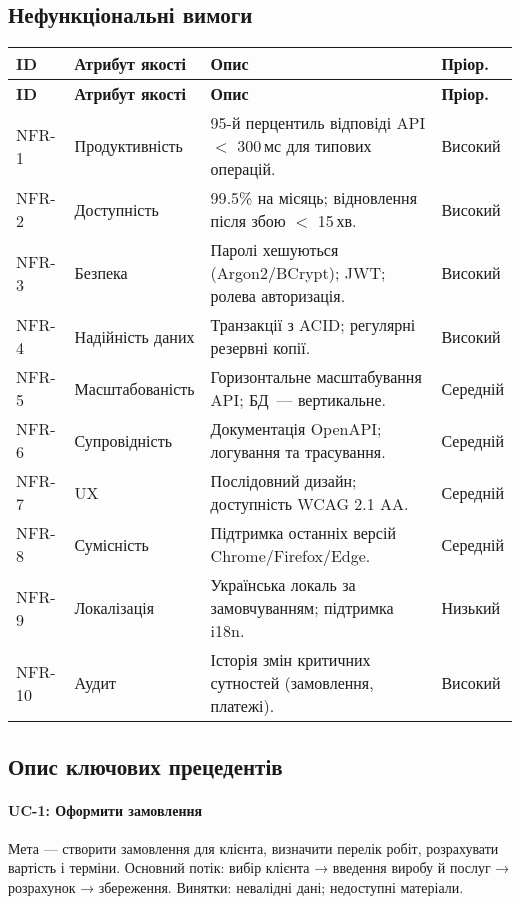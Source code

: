 \documentclass[14pt,a4paper]{extarticle}
\begin{document}
\subsection{Нефункціональні вимоги}
\begin{longtable}{@{}p{1.8cm} p{5.0cm} p{10.0cm} p{2.0cm}@{}}
\toprule
\textbf{ID} & \textbf{Атрибут якості} & \textbf{Опис} & \textbf{Пріор.}\\
\midrule
\endfirsthead
\toprule
\textbf{ID} & \textbf{Атрибут якості} & \textbf{Опис} & \textbf{Пріор.}\\
\midrule
\endhead
NFR-1 & Продуктивність & 95-й перцентиль відповіді API $<$ 300\,мс для типових операцій. & Високий \\
NFR-2 & Доступність & 99{.}5\% на місяць; відновлення після збою $<$ 15\,хв. & Високий \\
NFR-3 & Безпека & Паролі хешуються (Argon2/BCrypt); JWT; ролева авторизація. & Високий \\
NFR-4 & Надійність даних & Транзакції з ACID; регулярні резервні копії. & Високий \\
NFR-5 & Масштабованість & Горизонтальне масштабування API; БД~— вертикальне. & Середній \\
NFR-6 & Супровідність & Документація OpenAPI; логування та трасування. & Середній \\
NFR-7 & UX & Послідовний дизайн; доступність WCAG 2.1 AA. & Середній \\
NFR-8 & Сумісність & Підтримка останніх версій Chrome/Firefox/Edge. & Середній \\
NFR-9 & Локалізація & Українська локаль за замовчуванням; підтримка i18n. & Низький \\
NFR-10 & Аудит & Історія змін критичних сутностей (замовлення, платежі). & Високий \\
\bottomrule
\end{longtable}

\subsection{Опис ключових прецедентів}
\paragraph{UC-1: Оформити замовлення} Мета — створити замовлення для клієнта, визначити перелік робіт, розрахувати вартість і терміни. Основний потік: вибір клієнта → введення виробу й послуг → розрахунок → збереження. Винятки: невалідні дані; недоступні матеріали.
\end{document}
